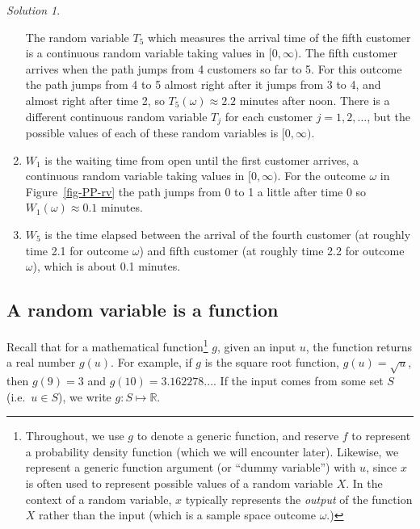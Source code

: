 \documentclass[
  letterpaper,
  DIV=11,
  numbers=noendperiod]{scrreprt}
\theoremstyle{plain}
\theoremstyle{definition}
\theoremstyle{definition}
\theoremstyle{definition}
\theoremstyle{remark}
\newtheorem{refsolution}{Solution}[chapter]
\begin{document}
\begin{tcolorbox}
\begin{refsolution}
\begin{enumerate}
  The random variable \(T_5\) which measures the arrival time of the
  fifth customer is a continuous random variable taking values in
  \([0, \infty)\). The fifth customer arrives when the path jumps from 4
  customers so far to 5. For this outcome the path jumps from 4 to 5
  almost right after it jumps from 3 to 4, and almost right after time
  2, so \(T_5(\omega)\approx 2.2\) minutes after noon. There is a
  different continuous random variable \(T_j\) for each customer
  \(j=1, 2, \ldots\), but the possible values of each of these random
  variables is \([0,\infty)\).
\item
  \(W_1\) is the waiting time from open until the first customer
  arrives, a continuous random variable taking values in
  \([0, \infty)\). For the outcome \(\omega\) in Figure~\ref{fig-PP-rv}
  the path jumps from 0 to 1 a little after time 0 so
  \(W_1(\omega)\approx 0.1\) minutes.
\item
  \(W_5\) is the time elapsed between the arrival of the fourth customer
  (at roughly time 2.1 for outcome \(\omega\)) and fifth customer (at
  roughly time 2.2 for outcome \(\omega\)), which is about 0.1 minutes.
\end{enumerate}

\label{sol-PP-rv}

\end{refsolution}

\end{tcolorbox}

\subsection{A random variable is a function}\label{sec-rv-function}

Recall that for a mathematical function\footnote{Throughout, we use
  \(g\) to denote a generic function, and reserve \(f\) to represent a
  probability density function (which we will encounter later).
  Likewise, we represent a generic function argument (or ``dummy
  variable'') with \(u\), since \(x\) is often used to represent
  possible values of a random variable \(X\). In the context of a random
  variable, \(x\) typically represents the \emph{output} of the function
  \(X\) rather than the input (which is a sample space outcome
  \(\omega\).)} \(g\), given an input \(u\), the function returns a real
number \(g(u)\). For example, if \(g\) is the square root function,
\(g(u) = \sqrt{u}\), then \(g(9) = 3\) and \(g(10) = 3.162278...\). If
the input comes from some set \(S\) (i.e.~\(u\in S\)), we write
\(g:S\mapsto \mathbb{R}\).
\end{document}

